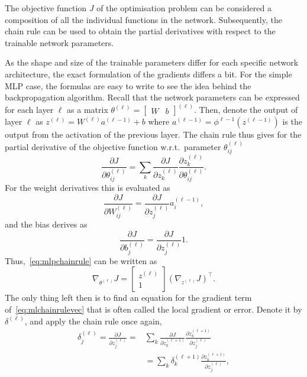 The objective function $J$ of the optimisation problem can be considered a composition of all the individual functions in the network.
Subsequently, the chain rule can be used to obtain the partial derivatives with respect to the trainable network parameters.

As the shape and size of the trainable parameters differ for each specific network architecture, the exact formulation of the gradients differs a bit.
For the simple MLP case, the formulas are easy to write to see the idea behind the backpropagation algorithm.
Recall that the network parameters can be expressed for each layer $\ell$ as a matrix $\theta^{(\ell)} = \begin{bmatrix} W & b \end{bmatrix}^{(\ell)}$.
Then, denote the output of layer $\ell$ as $z^{(\ell)} = W^{(\ell)} a^{(\ell-1)} + b$ where $a^{(\ell-1)} =  \phi^{\ell-1}(z^{(\ell-1)})$ is the output from the activation of the previous layer.
The chain rule thus gives for the partial derivative of the objective function w.r.t.\ parameter $\theta_{ij}^{(\ell)}$
\begin{equation}\label{eq:mlpchainrule}
    \frac{\partial J}{\partial \theta_{ij}^{(\ell)}} = \sum_{k} \frac{\partial J}{\partial z_{k}^{(\ell)}} \frac{\partial z_{k}^{(\ell)}}{\partial \theta_{ij}^{(\ell)}}. 
\end{equation}
For the weight derivatives this is evaluated as
\begin{equation*}
    \frac{\partial J}{\partial W_{ij}^{(\ell)}} = \frac{\partial J}{\partial z_{j}^{(\ell)}} a_{i}^{(\ell-1)},
\end{equation*}
and the bias derives as
\begin{equation*}
    \frac{\partial J}{\partial b_{j}^{(\ell)}} = \frac{\partial J}{\partial z_{j}^{(\ell)}} 1.
\end{equation*}
Thus,~\eqref{eq:mlpchainrule} can be written as
\begin{equation}\label{eq:mlchainrulevec}
    \nabla_{\theta^{(\ell)}} J = \begin{bmatrix} z^{(\ell)} \\ 1 \end{bmatrix} (\nabla_{z^{(\ell)}} J)^{\top}.
\end{equation}
The only thing left then is to find an equation for the gradient term of~\eqref{eq:mlchainrulevec} that is often called the local gradient or error.
Denote it by $\delta^{(\ell)}$, and apply the chain rule once again,
\begin{align*}
    \delta_{j}^{(\ell)} = \frac{\partial J}{\partial z_{j}^{(\ell)}} = &\sum_{k} \frac{\partial J}{\partial z_{k}^{(\ell + 1)}} \frac{\partial z_{k}^{(\ell+1)}}{\partial z_{j}^{(\ell)}} \\
                                                                       &= \sum_{k} \delta_{k}^{(\ell+1)} \frac{\partial z_{k}^{(\ell+1)}}{\partial z_{j}^{(\ell)}},
\end{align*}
